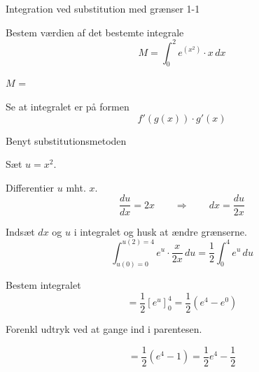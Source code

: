 \documentclass{article}
\begin{document}
\tableofcontents

\begin{exercise}{Integration ved substitution med grænser 1-1}
	
	
	Bestem værdien af det bestemte integrale
	\[
	M = \int_0^2 e^{(x^2)} \cdot x \, dx
	\]
	
	$M$ =  \\
	
	
	
	\hint
	
	Se at integralet er på formen
	\[
	f'(g(x)) \cdot g'(x)
	\]
	
	\hint
	
	Benyt substitutionsmetoden
	
	\hint
	
	Sæt $u=x^2$.
	
	
	\hint
	
	Differentier $u$ mht. $x$.
	\[
	\frac{du}{dx} = 2x \qquad	\Rightarrow \qquad dx = \frac{du}{2x}
	\]
	
	\hint
	
	Indsæt $dx$ og $u$ i integralet og husk at ændre grænserne.
	\[
	\int_{u(0)=0}^{u(2)=4} e^{u} \cdot \frac{x}{2x} \, du = \frac{1}{2} \int_{0}^{4} e^u \, du
	\]
	

	
	\hint
	
	Bestem integralet
	\[
	= \frac{1}{2} \left[e^u\right]_0^4 = \frac{1}{2} \left(  e^4-e^0 \right)
	\]
	
	\hint
	Forenkl udtryk ved at gange ind i parentesen.
	
	\hint
	
	\[
	= \frac{1}{2} \left(  e^4-1 \right) = \frac{1}{2} e^4 - \frac{1}{2}
	\]
	
	
	
\end{exercise}

\newpage
\end{document}
